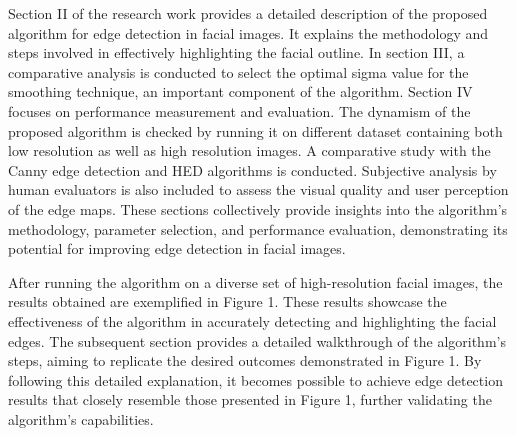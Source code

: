 \documentclass{70_styles/svproc}
\begin{document}
Section II of the research work provides a detailed description of the proposed algorithm for edge detection in facial images. It explains the methodology and steps involved in effectively highlighting the facial outline. In section III, a comparative analysis is conducted to select the optimal sigma value for the smoothing technique, an important component of the algorithm. Section IV focuses on performance measurement and evaluation. The dynamism of the proposed algorithm is checked by running it on different dataset containing both low resolution as well as high resolution images. A comparative study with the Canny edge detection and HED algorithms is conducted. Subjective analysis by human evaluators is also included to assess the visual quality and user perception of the edge maps. These sections collectively provide insights into the algorithm's methodology, parameter selection, and performance evaluation, demonstrating its potential for improving edge detection in facial images.

After running the algorithm on a diverse set of high-resolution facial images, the results obtained are exemplified in Figure 1. These results showcase the effectiveness of the algorithm in accurately detecting and highlighting the facial edges. The subsequent section provides a detailed walkthrough of the algorithm's steps, aiming to replicate the desired outcomes demonstrated in Figure 1. By following this detailed explanation, it becomes possible to achieve edge detection results that closely resemble those presented in Figure 1, further validating the algorithm's capabilities.
\end{document}
